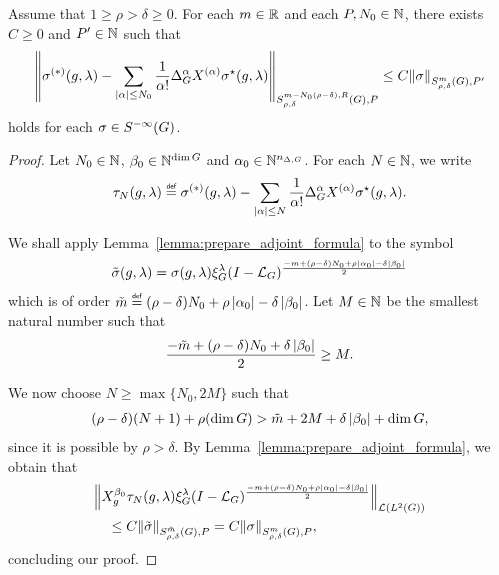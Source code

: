 \begin{proposition}
\label{proposition:adjoint_formula}
    Assume that $1 \geq \rho > \delta \geq 0$.
    For each $m \in \mathbb{R}$ and each $P, N_0 \in \mathbb{N}$,
    there exists $C \geq 0$ and $P' \in \mathbb{N}$ such that
    \begin{align*}
        \SymbolSemiNorm {m - N_0 (\rho - \delta), R} {\rho, \delta} P {%
        \sigma^{(*)}(g, \lambda)
        - \sum_{\abs \alpha \leq N_0} \frac 1 {\alpha!} \DifferenceOperatorOrder \alpha \TaylorLeftDifferentialOperator \alpha \adj \sigma(g, \lambda)
        } \leq
        C
        \SymbolSemiNorm m {\rho, \delta} {P'} \sigma
    \end{align*}
    holds for each $\sigma \in {S^{-\infty} (G)}$.
\end{proposition}
\begin{proof}
    Let $N_0 \in \mathbb{N}$, $\beta_0 \in \mathbb{N}^{\dim G}$ and $\alpha_0 \in \mathbb{N}^{n_{\Delta, G}}$.
    For each $N \in \mathbb{N}$,
    we write
    \begin{align*}
        \tau_N(g, \lambda) \defeq
        \sigma^{(*)}(g, \lambda)
        - \sum_{\abs \alpha \leq N} \frac 1 {\alpha!} \DifferenceOperatorOrder \alpha \TaylorLeftDifferentialOperator \alpha \adj \sigma(g, \lambda).
    \end{align*}

    We shall apply Lemma~\ref{lemma:prepare_adjoint_formula} to the symbol
    \begin{align*}
        \tilde \sigma(g, \lambda)
        = \sigma(g, \lambda)
        \xi^{\lambda}_{G} (I - {\mathcal{L}_{G}})^\frac{-m + (\rho - \delta) N_0 + \rho \left|{\alpha_0}\right| - \delta \left|{\beta_0}\right|}{2}
    \end{align*}
    which is of order $\tilde m \defeq (\rho - \delta) N_0 + \rho \abs {\alpha_0} - \delta \abs {\beta_0}$.
    Let $M \in \mathbb{N}$ be the smallest natural number such that
    \begin{align*}
        \frac {-\tilde m + (\rho - \delta) N_0 + \delta \left|{\beta_0}\right|} 2 \geq M.
    \end{align*}

    We now choose $N \geq \max \{N_0, 2M\}$ such that
    \begin{align*}
        (\rho - \delta) (N + 1) + \rho (\dim G)
        > \tilde m + 2 M + \delta \left|{\beta_0}\right| + \dim G,
    \end{align*}
    since it is possible by $\rho > \delta$.
    By Lemma~\ref{lemma:prepare_adjoint_formula},
    we obtain that
    \begin{align*}
        &\norm [\Lin {\Lebesgue 2 \Group}] {%
        \LeftDifferentialOperator [g] {\beta_0}
            \tau_N(g, \lambda)
            \Rep \lambda \BesselPotential {-m + (\rho - \delta) N_0 + \rho \abs {\alpha_0} - \delta \abs {\beta_0}}
        }\\
        &\quad \leq C \SymbolSemiNorm {\tilde m} {\rho, \delta} P {\tilde \sigma}
        = C \SymbolSemiNorm m {\rho, \delta} P \sigma,
    \end{align*}
    concluding our proof.
\end{proof}

